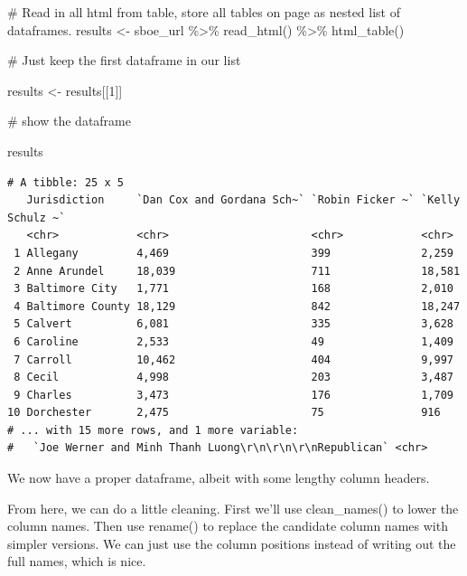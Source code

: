 \documentclass[
  letterpaper,
  DIV=11,
  numbers=noendperiod]{scrreprt}
\newenvironment{Shaded}{\begin{snugshade}}{\end{snugshade}}
\newcommand{\CommentTok}[1]{\textcolor[rgb]{0.37,0.37,0.37}{#1}}
\newcommand{\DecValTok}[1]{\textcolor[rgb]{0.68,0.00,0.00}{#1}}
\newcommand{\FunctionTok}[1]{\textcolor[rgb]{0.28,0.35,0.67}{#1}}
\newcommand{\NormalTok}[1]{\textcolor[rgb]{0.00,0.23,0.31}{#1}}
\newcommand{\OtherTok}[1]{\textcolor[rgb]{0.00,0.23,0.31}{#1}}
\newcommand{\SpecialCharTok}[1]{\textcolor[rgb]{0.37,0.37,0.37}{#1}}
\begin{document}
\begin{Shaded}
\begin{Highlighting}[]
\CommentTok{\# Read in all html from table, store all tables on page as nested list of dataframes.}
\NormalTok{results }\OtherTok{\textless{}{-}}\NormalTok{ sboe\_url }\SpecialCharTok{\%\textgreater{}\%}
  \FunctionTok{read\_html}\NormalTok{() }\SpecialCharTok{\%\textgreater{}\%}
  \FunctionTok{html\_table}\NormalTok{()}

\CommentTok{\# Just keep the first dataframe in our list}

\NormalTok{results }\OtherTok{\textless{}{-}}\NormalTok{ results[[}\DecValTok{1}\NormalTok{]]}

\CommentTok{\# show the dataframe}

\NormalTok{results}
\end{Highlighting}
\end{Shaded}

\begin{verbatim}
# A tibble: 25 x 5
   Jurisdiction     `Dan Cox and Gordana Sch~` `Robin Ficker ~` `Kelly Schulz ~`
   <chr>            <chr>                      <chr>            <chr>           
 1 Allegany         4,469                      399              2,259           
 2 Anne Arundel     18,039                     711              18,581          
 3 Baltimore City   1,771                      168              2,010           
 4 Baltimore County 18,129                     842              18,247          
 5 Calvert          6,081                      335              3,628           
 6 Caroline         2,533                      49               1,409           
 7 Carroll          10,462                     404              9,997           
 8 Cecil            4,998                      203              3,487           
 9 Charles          3,473                      176              1,709           
10 Dorchester       2,475                      75               916             
# ... with 15 more rows, and 1 more variable:
#   `Joe Werner and Minh Thanh Luong\r\n\r\n\r\nRepublican` <chr>
\end{verbatim}

We now have a proper dataframe, albeit with some lengthy column headers.

From here, we can do a little cleaning. First we'll use clean\_names()
to lower the column names. Then use rename() to replace the candidate
column names with simpler versions. We can just use the column positions
instead of writing out the full names, which is nice.
\end{document}
